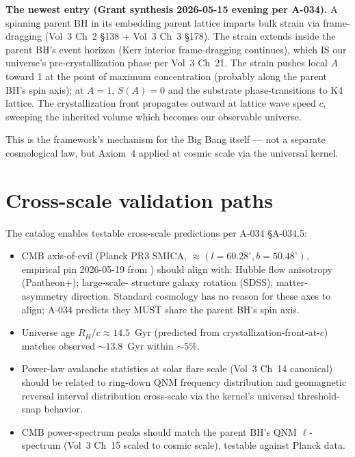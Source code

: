 \textbf{The newest entry (Grant synthesis 2026-05-15 evening per A-034).}
A spinning parent BH in its embedding parent lattice imparts bulk
strain via frame-dragging (Vol~3 Ch~2 \S138 + Vol~3 Ch~3 \S178). The
strain extends inside the parent BH's event horizon (Kerr interior
frame-dragging continues), which IS our universe's pre-crystallization
phase per Vol~3 Ch~21. The strain pushes local $A$ toward 1 at the
point of maximum concentration (probably along the parent BH's spin
axis); at $A = 1$, $S(A) = 0$ and the substrate phase-transitions to
K4 lattice. The crystallization front propagates outward at lattice
wave speed $c$, sweeping the inherited volume which becomes our
observable universe.

This is the framework's mechanism for the Big Bang itself --- not a
separate cosmological law, but Axiom~4 applied at cosmic scale via
the universal kernel.

\section{Cross-scale validation paths}

The catalog enables testable cross-scale predictions per A-034 \S A-034.5:

\begin{itemize}
    \item CMB axis-of-evil (Planck PR3 SMICA, $\approx (l=60.28^\circ, b=50.48^\circ)$,
    empirical pin 2026-05-19 from )
    should align with: Hubble flow anisotropy (Pantheon+); large-scale-
    structure galaxy rotation (SDSS); matter-asymmetry direction.
    Standard cosmology has no reason for these axes to align;
    A-034 predicts they MUST share the parent BH's spin axis.

    \item Universe age $R_H / c \approx 14.5$~Gyr (predicted from
    crystallization-front-at-$c$) matches observed $\sim 13.8$~Gyr
    within $\sim 5\%$.

    \item Power-law avalanche statistics at solar flare scale (Vol~3
    Ch~14 canonical) should be related to ring-down QNM frequency
    distribution and geomagnetic reversal interval distribution
    cross-scale via the kernel's universal threshold-snap behavior.

    \item CMB power-spectrum peaks should match the parent BH's QNM
    $\ell$-spectrum (Vol~3 Ch~15 scaled to cosmic scale), testable
    against Planck data.
\end{itemize}

